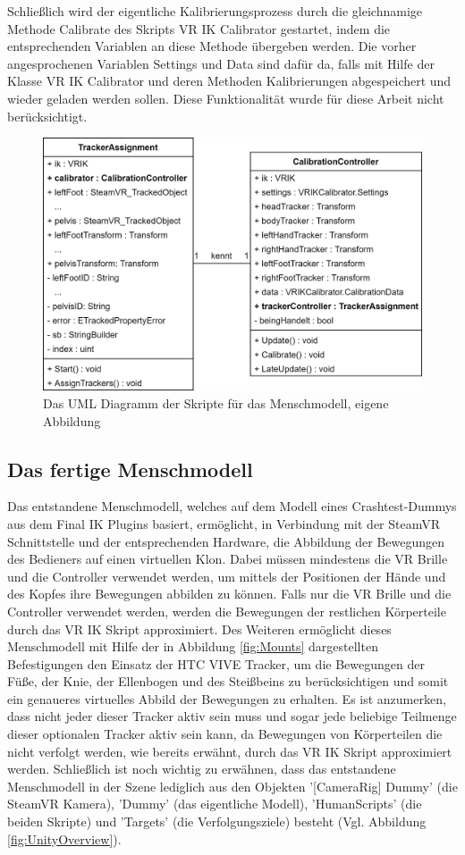 Schließlich wird der eigentliche Kalibrierungsprozess durch die gleichnamige Methode Calibrate des Skripts VR IK Calibrator gestartet, indem die entsprechenden Variablen an diese Methode übergeben werden. Die vorher angesprochenen Variablen Settings und Data sind dafür da, falls mit Hilfe der Klasse VR IK Calibrator und deren Methoden Kalibrierungen abgespeichert und wieder geladen werden sollen. Diese Funktionalität wurde für diese Arbeit nicht berücksichtigt.
\begin{figure}[h]
	\centering
	\includegraphics[width=0.6\linewidth]{Bilder/A40_MenschUML}
	\caption{Das UML Diagramm der Skripte für das Menschmodell, eigene Abbildung}
	\label{fig:MenschUML}
\end{figure}

\subsection{Das fertige Menschmodell}\label{sec:MMFunktionen}
Das entstandene Menschmodell, welches auf dem Modell eines Crashtest-Dummys aus dem Final IK Plugins basiert, ermöglicht, in Verbindung mit der SteamVR Schnittstelle und der entsprechenden Hardware, die Abbildung der Bewegungen des Bedieners auf einen virtuellen Klon. Dabei müssen mindestens die VR Brille und die Controller verwendet werden, um mittels der Positionen der Hände und des Kopfes ihre Bewegungen abbilden zu können. Falls nur die VR Brille und die Controller verwendet werden, werden die Bewegungen der restlichen Körperteile durch das VR IK Skript approximiert. Des Weiteren ermöglicht dieses Menschmodell mit Hilfe der in Abbildung \ref{fig:Mounts} dargestellten Befestigungen den Einsatz der HTC VIVE Tracker, um die Bewegungen der Füße, der Knie, der Ellenbogen und des Steißbeins zu berücksichtigen und somit ein genaueres virtuelles Abbild der Bewegungen zu erhalten. Es ist anzumerken, dass nicht jeder dieser Tracker aktiv sein muss und sogar jede beliebige Teilmenge dieser optionalen Tracker aktiv sein kann, da Bewegungen von Körperteilen die nicht verfolgt werden, wie bereits erwähnt, durch das VR IK Skript approximiert werden.
\newline
Schließlich ist noch wichtig zu erwähnen, dass das entstandene Menschmodell in der Szene lediglich aus den Objekten '[CameraRig] Dummy' (die SteamVR Kamera), 'Dummy' (das eigentliche Modell), 'HumanScripts' (die beiden Skripte) und 'Targets' (die Verfolgungsziele) besteht (Vgl. Abbildung \ref{fig:UnityOverview}).

